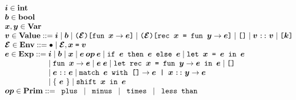 \documentclass[11pt]{jarticle}
\begin{document}
\[\begin{array}{l}
\EvalDContMLivMV{i}[] \in \mathbf{int}\\
\EvalDContMLivMV{b}[] \in \mathbf{bool}\\
\EvalDContMLivMV{x}[], \EvalDContMLivMV{y}[] \in
\mathbf{Var}\\
\EvalDContMLivMV{v}[] \in \mathbf{Value} ::= \EvalDContMLivMV{i}[]
\mid \EvalDContMLivMV{b}[]
\mid \EvalDContMLivFunTerm{\EvalDContMLivMV{env}[]}{\EvalDContMLivMV{x}[]}
{\EvalDContMLivMV{e}[]} \mid \EvalDContMLivRecTerm{\EvalDContMLivMV{env}[]}
{\EvalDContMLivMV{x}[]}{\EvalDContMLivMV{y}[]}{\EvalDContMLivMV{e}[]}
\mid \EvalDContMLivNilVTerm
\mid \EvalDContMLivConsVTerm{\EvalDContMLivMV{v}[]}{\EvalDContMLivMV{v}[]}
\mid \EvalDContMLivContFTerm{\EvalDContMLivMV{k}[]}\\
\EvalDContMLivMV{env}[] \in \mathbf{Env} ::= \EvalDContMLivEmptyTerm
\mid \EvalDContMLivBindTerm{\EvalDContMLivMV{env}[]}{\EvalDContMLivMV{x}[]}
{\EvalDContMLivMV{v}[]}\\
\EvalDContMLivMV{e}[] \in \mathbf{Exp} ::= \EvalDContMLivMV{i}[]
\mid \EvalDContMLivMV{b}[] \mid \EvalDContMLivMV{x}[]
\mid \EvalDContMLivBinOpTerm{\EvalDContMLivMV{op}[]}{\EvalDContMLivMV{e}[]}
{\EvalDContMLivMV{e}[]} \mid \EvalDContMLivIfTerm{\EvalDContMLivMV{e}[]}
{\EvalDContMLivMV{e}[]}{\EvalDContMLivMV{e}[]}
\mid \EvalDContMLivLetTerm{\EvalDContMLivMV{x}[]}{\EvalDContMLivMV{e}[]}
{\EvalDContMLivMV{e}[]} 
\\ \hspace*{2.0cm}
\mid \EvalDContMLivAbsTerm{\EvalDContMLivMV{x}[]}
{\EvalDContMLivMV{e}[]} \mid \EvalDContMLivAppTerm{\EvalDContMLivMV{e}[]}
{\EvalDContMLivMV{e}[]} \mid \EvalDContMLivLetRecTerm{\EvalDContMLivMV{x}[]}
{\EvalDContMLivMV{y}[]}{\EvalDContMLivMV{e}[]}{\EvalDContMLivMV{e}[]}
\mid \EvalDContMLivNilTerm 
\\ \hspace*{2.0cm}
\mid \EvalDContMLivConsTerm{\EvalDContMLivMV{e}[]}
{\EvalDContMLivMV{e}[]} \mid \EvalDContMLivMatchTerm{\EvalDContMLivMV{e}[]}
{\EvalDContMLivMV{e}[]}{\EvalDContMLivMV{x}[]}{\EvalDContMLivMV{y}[]}
{\EvalDContMLivMV{e}[]} 
\\ \hspace*{2.0cm}
\mid \EvalDContMLivResetTerm{\EvalDContMLivMV{e}[]}
\mid \EvalDContMLivShiftTerm{\EvalDContMLivMV{x}[]}
{\EvalDContMLivMV{e}[]}\\
\EvalDContMLivMV{op}[] \in \mathbf{Prim} ::= \EvalDContMLivPlusTerm
\mid \EvalDContMLivMinusTerm \mid \EvalDContMLivMultTerm
\mid \EvalDContMLivLtTerm\\

\end{array}\]
\end{document}
